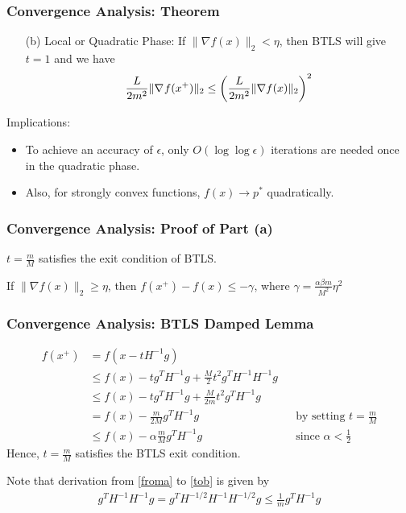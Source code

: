 \documentclass{beamer}
\newcommand{\be}{\begin{eqnarray}}
\newcommand{\ee}{\end{eqnarray}}
\newcommand{\n}{\nonumber}
\begin{document}
\begin{frame}
    \frametitle{Convergence Analysis: Theorem}    
    \begin{theorem}[Part II]
        \begin{itemize}
            \item[(b)] Local or Quadratic Phase: If $\|\nabla f(x)\|_2 < \eta$,
                then BTLS will give $t = 1$ and we have
                \be
                \frac{L}{2m^2} \|\gradient{}{f}{x^{+}}\|_2 \leq 
                    \bigg(\frac{L}{2m^2} \|\nabla f(x)\|_2 \bigg)^2
                \ee
        \end{itemize}
    \end{theorem}
    Implications:
    \begin{itemize}
    \item To achieve an accuracy of $\epsilon$, only $O(\log \log \epsilon)$ iterations are needed once in the quadratic phase.
    \item Also, for strongly convex functions, $f(x) \to p^{*}$ quadratically.
    \end{itemize}
\end{frame}

\begin{frame}
    \frametitle{Convergence Analysis: Proof of Part (a)}    
    \begin{lemma}
        $t = \frac{m}{M}$ satisfies the exit condition of BTLS.
    \end{lemma}
    \begin{lemma}
        If $\|\nabla f(x)\|_2 \geq \eta$, 
        then $f(x^{+}) - f(x) \leq -\gamma$, 
        where  $\gamma = \frac{\alpha \beta m}{M^2}\eta^2$
    \end{lemma}
\end{frame}

\begin{frame}
    \frametitle{Convergence Analysis: BTLS Damped Lemma}    
\begin{align}
f(x^{+}) & = f(x-tH^{-1}g) \n \\
& \le f(x) - tg^TH^{-1}g + \frac{M}{2}t^2g^TH^{-1}H^{-1}g \label{froma} \\
& \le f(x) - tg^TH^{-1}g + \frac{M}{2m}t^2 g^T H^{-1}g \label{tob}\\
& = f(x) -  \frac{m}{2M} g^T H^{-1}g  &&
    \text{by setting $t=\frac{m}{M}$} \n \\
    & \le f(x) - \alpha \frac{m}{M} g^T H^{-1}g && \text{since }\alpha <
    \frac{1}{2} \n
\end{align}
Hence, $t = \frac{m}{M}$ satisfies the BTLS exit condition.

Note that derivation from \eqref{froma} to \eqref{tob} is given by
\be
g^TH^{-1}H^{-1}g = g^TH^{-1/2}H^{-1}H^{-1/2}g \le \frac{1}{m} g^T H^{-1}g \n
\ee

\end{frame}
\end{document}
